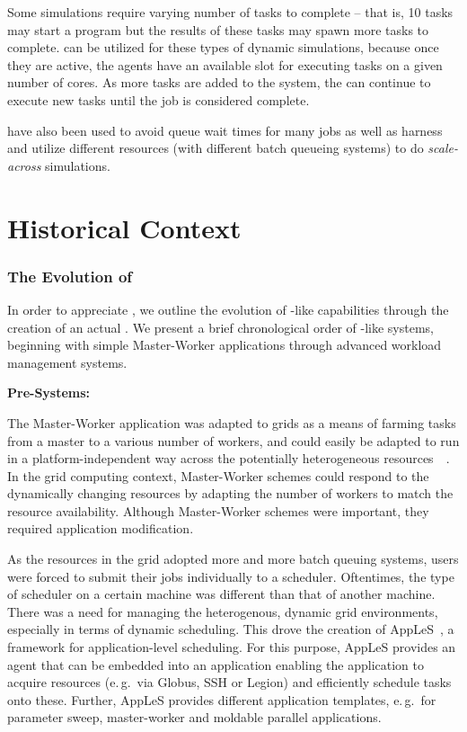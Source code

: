 \documentclass{sig-alternate}
\begin{document}
Some simulations require varying number of tasks to complete -- that
is, 10 tasks may start a program but the results of these tasks may
spawn more tasks to complete. \pilotjobs can be utilized for these
types of dynamic simulations, because once they are active, the agents
have an available slot for executing tasks on a given number of
cores. As more tasks are added to the system, the \pilot can continue
to execute new tasks until the job is considered
complete. %

\pilotjobs have also been used to avoid queue wait times for many jobs
as well as harness and utilize different resources (with different
batch queueing systems) to do \textit{scale-across} simulations.



\section{Historical Context}
\subsubsection*{The Evolution of \pilotjobs}

In order to appreciate \pilotjobs, we outline the evolution of \pilot-like capabilities through the creation of an actual \pilotjob. We present a brief chronological order of \pilotjob-like systems, beginning with simple Master-Worker applications through advanced workload management systems.

\textbf{Pre-\pilotjob Systems:}

The Master-Worker application was adapted to grids as a means of farming tasks from a master to a various number of workers, and could easily be adapted to run in a platform-independent way across the potentially heterogeneous resources~\cite{masterworker}~\cite{Goux00anenabling}. In the grid computing context, Master-Worker schemes could respond to the dynamically changing resources by adapting the number of workers to match the resource availability. Although Master-Worker schemes were important, they required application modification.

As the resources in the grid adopted more and more batch queuing systems, users were forced to submit their jobs individually to a scheduler. Oftentimes, the type of scheduler on a certain machine was different than that of another machine. There was a need for managing the heterogenous, dynamic grid environments, especially in terms of dynamic scheduling. This drove the creation of AppLeS~\cite{Berman:2003:ACG:766629.766632}, a framework for 
application-level scheduling. For this purpose, AppLeS provides an agent that 
can be embedded into an application enabling the application to acquire 
resources (e.\,g.\ via Globus, SSH or Legion) and efficiently schedule tasks 
onto these. Further, AppLeS provides different application templates,
e.\,g.\ for parameter sweep, master-worker and moldable parallel applications.
\end{document}

